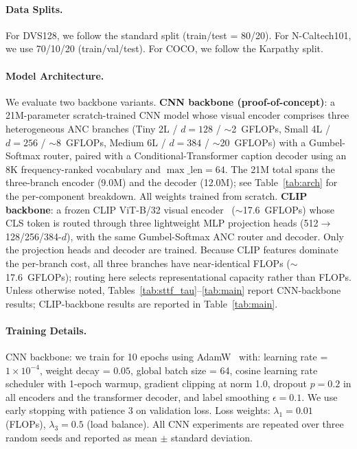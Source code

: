 \documentclass{article}
\begin{document}
\paragraph{Data Splits.}
For DVS128, we follow the standard split (train/test = 80/20).
For N-Caltech101, we use 70/10/20 (train/val/test).
For COCO, we follow the Karpathy split.

\paragraph{Model Architecture.}
We evaluate two backbone variants.
\textbf{CNN backbone (proof-of-concept)}: a 21M-parameter scratch-trained CNN model whose visual encoder comprises three heterogeneous ANC branches (Tiny 2L / $d{=}128$ / $\sim$2~GFLOPs, Small 4L / $d{=}256$ / $\sim$8~GFLOPs, Medium 6L / $d{=}384$ / $\sim$20~GFLOPs) with a Gumbel-Softmax router, paired with a Conditional-Transformer caption decoder using an 8K frequency-ranked vocabulary and $\max\_{\text{len}}{=}64$. The 21M total spans the three-branch encoder (9.0M) and the decoder (12.0M); see Table~\ref{tab:arch} for the per-component breakdown. All weights trained from scratch.
\textbf{CLIP backbone}: a frozen CLIP ViT-B/32 visual encoder~\cite{radford2021clip} ($\sim$17.6~GFLOPs) whose CLS token is routed through three lightweight MLP projection heads (512$\to$128/256/384-$d$), with the same Gumbel-Softmax ANC router and decoder. Only the projection heads and decoder are trained. Because CLIP features dominate the per-branch cost, all three branches have near-identical FLOPs ($\sim$17.6~GFLOPs); routing here selects representational capacity rather than FLOPs. Unless otherwise noted, Tables~\ref{tab:sttf_tau}--\ref{tab:main} report CNN-backbone results; CLIP-backbone results are reported in Table~\ref{tab:main}.

\paragraph{Training Details.}
CNN backbone: we train for 10 epochs using AdamW~\cite{loshchilov2019adamw} with:
learning rate = $1 \times 10^{-4}$,
weight decay = $0.05$,
global batch size = 64,
cosine learning rate scheduler with 1-epoch warmup,
gradient clipping at norm 1.0,
dropout $p=0.2$ in all encoders and the transformer decoder,
and label smoothing $\epsilon=0.1$.
We use early stopping with patience 3 on validation loss.
Loss weights: $\lambda_1=0.01$ (FLOPs), $\lambda_3=0.5$ (load balance).
All CNN experiments are repeated over three random seeds and reported as mean $\pm$ standard deviation.
\end{document}
